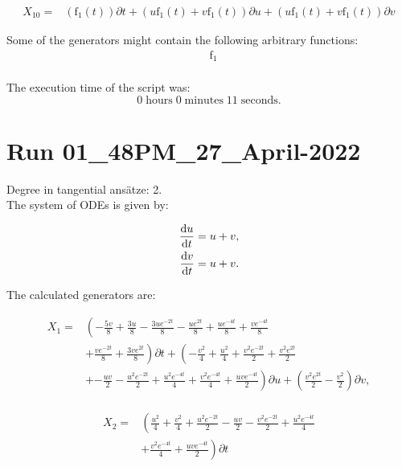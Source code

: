 \begin{align*}
X_{10}=&\left(\operatorname{f_{1}}{\left(t \right)} \right)\partial t+\left(u \operatorname{f_{1}}{\left(t \right)}+v \operatorname{f_{1}}{\left(t \right)} \right)\partial u+\left(u \operatorname{f_{1}}{\left(t \right)}+v \operatorname{f_{1}}{\left(t \right)} \right)\partial v
\end{align*}



\noindent Some of the generators might contain the following arbitrary functions:
\begin{align*}
&\operatorname{f_{1}}\\
\end{align*}

\noindent The execution time of the script was:
$$0\;\mathrm{hours}\;0\;\mathrm{minutes}\;11 \;\mathrm{seconds}.$$
\section*{Run 01\_48PM\_27\_April-2022}
Degree in tangential ansätze:	2.\\
The system of ODEs is given by:

\begin{align*}
\dv{u}{t}&=u + v,\\
\dv{v}{t}&=u + v.\\
\end{align*}

\noindent The calculated generators are:

\begin{align*}
X_{1}=&\left(- \frac{5 v}{8}+\frac{3 u}{8}- \frac{3 u e^{- 2 t}}{8}- \frac{u e^{2 t}}{8}+\frac{u e^{- 4 t}}{8}+\frac{v e^{- 4 t}}{8}\right.\\
&+\left.\frac{v e^{- 2 t}}{8}+\frac{3 v e^{2 t}}{8} \right)\partial t+\left(- \frac{v^{2}}{4}+\frac{u^{2}}{4}+\frac{v^{2} e^{- 2 t}}{2}+\frac{v^{2} e^{2 t}}{2}\right.\\
&+\left.- \frac{u v}{2}- \frac{u^{2} e^{- 2 t}}{2}+\frac{u^{2} e^{- 4 t}}{4}+\frac{v^{2} e^{- 4 t}}{4}+\frac{u v e^{- 4 t}}{2} \right)\partial u+\left(\frac{v^{2} e^{2 t}}{2} - \frac{v^{2}}{2} \right)\partial v,\\
\end{align*}

\begin{align*}
X_{2}=&\left(\frac{u^{2}}{4}+\frac{v^{2}}{4}+\frac{u^{2} e^{- 2 t}}{2}- \frac{u v}{2}- \frac{v^{2} e^{- 2 t}}{2}+\frac{u^{2} e^{- 4 t}}{4}\right.\\
&+\left.\frac{v^{2} e^{- 4 t}}{4}+\frac{u v e^{- 4 t}}{2} \right)\partial t
\end{align*}

